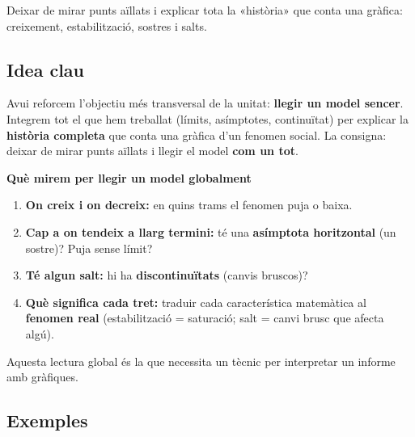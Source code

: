 %
{Deixar de mirar punts aïllats i explicar tota la «història» que conta una gràfica: creixement, estabilització, sostres i salts.}

\subsection{Idea clau}

Avui reforcem l'objectiu més transversal de la unitat: \textbf{llegir un model
sencer}. Integrem tot el que hem treballat (límits, asímptotes, continuïtat) per
explicar la \textbf{història completa} que conta una gràfica d'un fenomen social. La
consigna: deixar de mirar punts aïllats i llegir el model \textbf{com un tot}.

\begin{idea}
\textbf{Què mirem per llegir un model globalment}
\begin{enumerate}[leftmargin=1.6em, itemsep=2pt]
  \item \textbf{On creix i on decreix:} en quins trams el fenomen puja o baixa.
  \item \textbf{Cap a on tendeix a llarg termini:} té una \textbf{asímptota
        horitzontal} (un sostre)? Puja sense límit?
  \item \textbf{Té algun salt:} hi ha \textbf{discontinuïtats} (canvis bruscos)?
  \item \textbf{Què significa cada tret:} traduir cada característica matemàtica al
        \textbf{fenomen real} (estabilització = saturació; salt = canvi brusc que
        afecta algú).
\end{enumerate}
Aquesta lectura global és la que necessita un tècnic per interpretar un informe amb
gràfiques.
\end{idea}

\subsection{Exemples}

